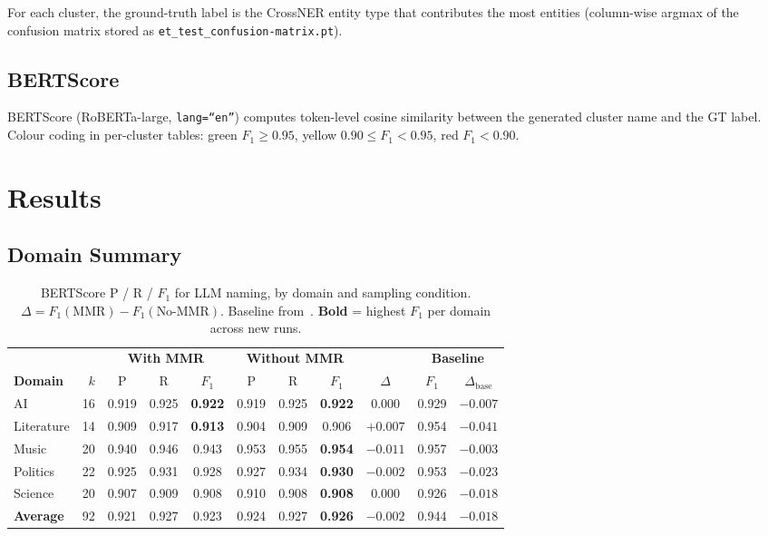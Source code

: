 \documentclass[11pt,a4paper]{article}
\begin{document}
For each cluster, the ground-truth label is the CrossNER entity type that contributes the most entities (column-wise argmax of the confusion matrix stored as \texttt{et\_test\_confusion-matrix.pt}).

\subsection{BERTScore}

BERTScore (RoBERTa-large, \texttt{lang=``en''}) computes token-level cosine similarity between the generated cluster name and the GT label.
Colour coding in per-cluster tables: \colorbox{green!15}{green} $F_1 \geq 0.95$, \colorbox{yellow!25}{yellow} $0.90 \leq F_1 < 0.95$, \colorbox{red!15}{red} $F_1 < 0.90$.

\section{Results}

\subsection{Domain Summary}

\begin{table}[h]
\centering
\caption{BERTScore P / R / $F_1$ for LLM naming, by domain and sampling condition.
$\Delta = F_1(\text{MMR}) - F_1(\text{No-MMR})$.
Baseline from~\cite{cluster_naming_baseline}.
\textbf{Bold} = highest $F_1$ per domain across new runs.}
\label{tab:summary}
\small
\setlength{\tabcolsep}{5pt}
\begin{tabular}{l r ccc ccc c cc}
\toprule
& & \multicolumn{3}{c}{\cellcolor{mmrcolor}\textbf{With MMR}} &
    \multicolumn{3}{c}{\cellcolor{nommrcolor}\textbf{Without MMR}} &
    &
    \multicolumn{2}{c}{\cellcolor{basecolor}\textbf{Baseline}} \\
\cmidrule(lr){3-5}\cmidrule(lr){6-8}\cmidrule(lr){10-11}
\textbf{Domain} & $k$ & P & R & $F_1$ & P & R & $F_1$ & $\Delta$ & $F_1$ & $\Delta_\text{base}$ \\
\midrule
AI         & 16 & 0.919 & 0.925 & \textbf{0.922} & 0.919 & 0.925 & \textbf{0.922} & $0.000$ & 0.929 & $-0.007$ \\
Literature & 14 & 0.909 & 0.917 & \textbf{0.913} & 0.904 & 0.909 & 0.906 & $+0.007$ & 0.954 & $-0.041$ \\
Music      & 20 & 0.940 & 0.946 & 0.943 & 0.953 & 0.955 & \textbf{0.954} & $-0.011$ & 0.957 & $-0.003$ \\
Politics   & 22 & 0.925 & 0.931 & 0.928 & 0.927 & 0.934 & \textbf{0.930} & $-0.002$ & 0.953 & $-0.023$ \\
Science    & 20 & 0.907 & 0.909 & 0.908 & 0.910 & 0.908 & \textbf{0.908} & $0.000$ & 0.926 & $-0.018$ \\
\midrule
\textbf{Average} & 92 & 0.921 & 0.927 & 0.923 & 0.924 & 0.927 & \textbf{0.926} & $-0.002$ & 0.944 & $-0.018$ \\
\bottomrule
\end{tabular}
\end{table}
\end{document}
